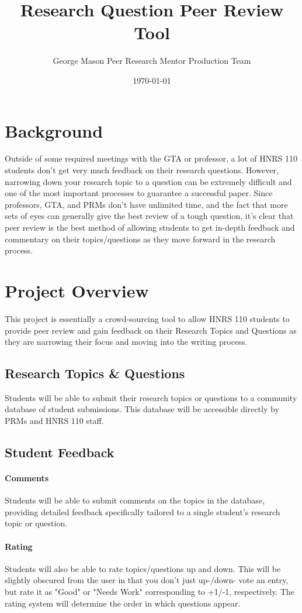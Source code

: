 \documentclass{article}
\title{\textbf{Research Question Peer Review Tool}}
\author{George Mason Peer Research Mentor Production Team}
\date{\today}
\begin{document}
\maketitle

\section{Background}

Outside of some required meetings with the GTA or professor, a lot of HNRS
110 students don't get very much feedback on their research questions.
However, narrowing down your research topic to a question can be extremely
difficult and one of the most important processes to guarantee a successful
paper. Since professors, GTA, and PRMs don't have unlimited time, and the
fact that more sets of eyes can generally give the best review of a tough
question, it's clear that peer review is the best method of allowing
students to get in-depth feedback and commentary on their topics/questions
as they move forward in the research process.

\section{Project Overview}
This project is essentially a crowd-sourcing tool to allow HNRS 110
students to provide peer review and gain feedback on their Research Topics
and Questions as they are narrowing their focus and moving into the writing
process.

\subsection{Research Topics \& Questions}
Students will be able to submit their research topics or questions to a
community database of student submissions. This database will be accessible
directly by PRMs and HNRS 110 staff.

\subsection{Student Feedback}
\paragraph{Comments} Students will be able to submit comments on the topics
in the database, providing detailed feedback specifically tailored to a
single student's research topic or question.

\paragraph{Rating} Students will also be able to rate topics/questions up
and down. This will be slightly obscured from the user in that you don't
just up-/down- vote an entry, but rate it as "Good" or "Needs Work"
corresponding to +1/-1, respectively. The rating system will determine the
order in which questions appear.
\end{document}
